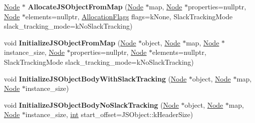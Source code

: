 \begin{DoxyCompactItemize}
\item 
\mbox{\label{classv8_1_1internal_1_1CodeStubAssembler_af6c8b66fc032b9462382c32fe6e6b94e}} 
\mbox{\hyperlink{classv8_1_1internal_1_1compiler_1_1Node}{Node}} $\ast$ {\bfseries Allocate\+J\+S\+Object\+From\+Map} (\mbox{\hyperlink{classv8_1_1internal_1_1compiler_1_1Node}{Node}} $\ast$map, \mbox{\hyperlink{classv8_1_1internal_1_1compiler_1_1Node}{Node}} $\ast$properties=nullptr, \mbox{\hyperlink{classv8_1_1internal_1_1compiler_1_1Node}{Node}} $\ast$elements=nullptr, \mbox{\hyperlink{classv8_1_1base_1_1Flags}{Allocation\+Flags}} flags=k\+None, Slack\+Tracking\+Mode slack\+\_\+tracking\+\_\+mode=k\+No\+Slack\+Tracking)
\item 
\mbox{\label{classv8_1_1internal_1_1CodeStubAssembler_a08bc7dfd6c76f994c70085fa326534aa}} 
void {\bfseries Initialize\+J\+S\+Object\+From\+Map} (\mbox{\hyperlink{classv8_1_1internal_1_1compiler_1_1Node}{Node}} $\ast$object, \mbox{\hyperlink{classv8_1_1internal_1_1compiler_1_1Node}{Node}} $\ast$map, \mbox{\hyperlink{classv8_1_1internal_1_1compiler_1_1Node}{Node}} $\ast$instance\+\_\+size, \mbox{\hyperlink{classv8_1_1internal_1_1compiler_1_1Node}{Node}} $\ast$properties=nullptr, \mbox{\hyperlink{classv8_1_1internal_1_1compiler_1_1Node}{Node}} $\ast$elements=nullptr, Slack\+Tracking\+Mode slack\+\_\+tracking\+\_\+mode=k\+No\+Slack\+Tracking)
\item 
\mbox{\label{classv8_1_1internal_1_1CodeStubAssembler_acc7e7ebf062d1d1afe486003137fc947}} 
void {\bfseries Initialize\+J\+S\+Object\+Body\+With\+Slack\+Tracking} (\mbox{\hyperlink{classv8_1_1internal_1_1compiler_1_1Node}{Node}} $\ast$object, \mbox{\hyperlink{classv8_1_1internal_1_1compiler_1_1Node}{Node}} $\ast$map, \mbox{\hyperlink{classv8_1_1internal_1_1compiler_1_1Node}{Node}} $\ast$instance\+\_\+size)
\item 
\mbox{\label{classv8_1_1internal_1_1CodeStubAssembler_ab370605badcc60e98f5757439307c333}} 
void {\bfseries Initialize\+J\+S\+Object\+Body\+No\+Slack\+Tracking} (\mbox{\hyperlink{classv8_1_1internal_1_1compiler_1_1Node}{Node}} $\ast$object, \mbox{\hyperlink{classv8_1_1internal_1_1compiler_1_1Node}{Node}} $\ast$map, \mbox{\hyperlink{classv8_1_1internal_1_1compiler_1_1Node}{Node}} $\ast$instance\+\_\+size, \mbox{\hyperlink{classint}{int}} start\+\_\+offset=J\+S\+Object\+::k\+Header\+Size)

\end{DoxyCompactItemize}
